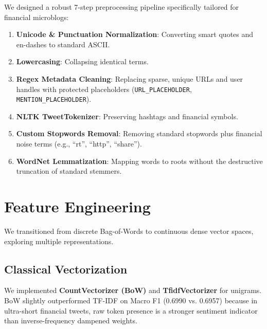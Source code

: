 \documentclass[11pt,a4paper]{article}
\begin{document}
We designed a robust 7-step preprocessing pipeline specifically tailored for financial microblogs:
\begin{enumerate}[noitemsep]
    \item \textbf{Unicode \& Punctuation Normalization}: Converting smart quotes and en-dashes to standard ASCII.
    \item \textbf{Lowercasing}: Collapsing identical terms.
    \item \textbf{Regex Metadata Cleaning}: Replacing sparse, unique URLs and user handles with protected placeholders (\texttt{URL\_PLACEHOLDER}, \texttt{MENTION\_PLACEHOLDER}).
    \item \textbf{NLTK TweetTokenizer}: Preserving hashtags and financial symbols.
    \item \textbf{Custom Stopwords Removal}: Removing standard stopwords plus financial noise terms (e.g., ``rt'', ``http'', ``share'').
    \item \textbf{WordNet Lemmatization}: Mapping words to roots without the destructive truncation of standard stemmers.
\end{enumerate}

\section{Feature Engineering}

We transitioned from discrete Bag-of-Words to continuous dense vector spaces, exploring multiple representations.

\subsection{Classical Vectorization}
We implemented \textbf{CountVectorizer (BoW)} and \textbf{TfidfVectorizer} for unigrams. BoW slightly outperformed TF-IDF on Macro F1 (0.6990 vs. 0.6957) because in ultra-short financial tweets, raw token presence is a stronger sentiment indicator than inverse-frequency dampened weights. 
\end{document}
